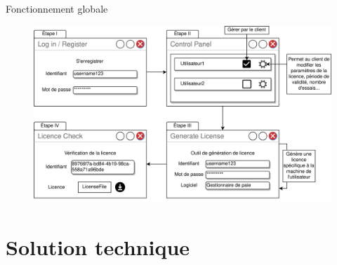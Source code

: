 \documentclass{cubeamer}
\begin{document}

\begin{frame}{Fonctionnement globale}
    \begin{figure}
        \centering
        \vspace{-0.1cm}
        \includegraphics[scale=0.58]{img/STB.png}
    \end{figure}
\end{frame}

\section{Solution technique}
\end{document}
